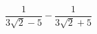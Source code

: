 \begin{ex}[type=calculate]
	\begin{condition}
		\( \dfrac{1}{3\sqrt{2}-5}-\dfrac{1}{3\sqrt{2}+5} \)
	\end{condition}
\end{ex}